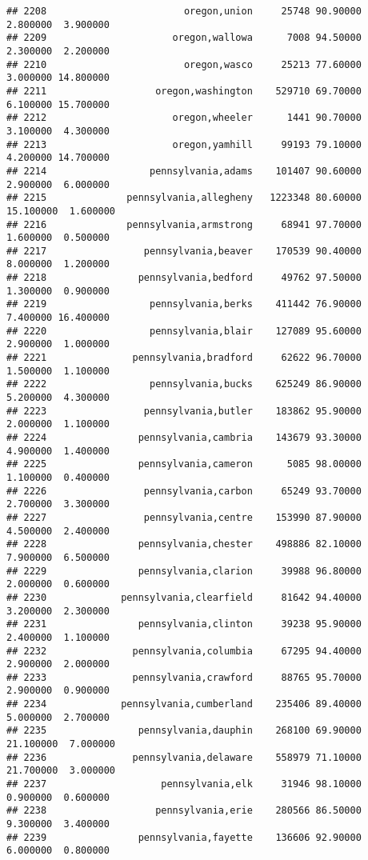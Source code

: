 \documentclass[
]{article}
\begin{document}
\begin{verbatim}
## 2208                        oregon,union     25748 90.90000  2.800000  3.900000
## 2209                      oregon,wallowa      7008 94.50000  2.300000  2.200000
## 2210                        oregon,wasco     25213 77.60000  3.000000 14.800000
## 2211                   oregon,washington    529710 69.70000  6.100000 15.700000
## 2212                      oregon,wheeler      1441 90.70000  3.100000  4.300000
## 2213                      oregon,yamhill     99193 79.10000  4.200000 14.700000
## 2214                  pennsylvania,adams    101407 90.60000  2.900000  6.000000
## 2215              pennsylvania,allegheny   1223348 80.60000 15.100000  1.600000
## 2216              pennsylvania,armstrong     68941 97.70000  1.600000  0.500000
## 2217                 pennsylvania,beaver    170539 90.40000  8.000000  1.200000
## 2218                pennsylvania,bedford     49762 97.50000  1.300000  0.900000
## 2219                  pennsylvania,berks    411442 76.90000  7.400000 16.400000
## 2220                  pennsylvania,blair    127089 95.60000  2.900000  1.000000
## 2221               pennsylvania,bradford     62622 96.70000  1.500000  1.100000
## 2222                  pennsylvania,bucks    625249 86.90000  5.200000  4.300000
## 2223                 pennsylvania,butler    183862 95.90000  2.000000  1.100000
## 2224                pennsylvania,cambria    143679 93.30000  4.900000  1.400000
## 2225                pennsylvania,cameron      5085 98.00000  1.100000  0.400000
## 2226                 pennsylvania,carbon     65249 93.70000  2.700000  3.300000
## 2227                 pennsylvania,centre    153990 87.90000  4.500000  2.400000
## 2228                pennsylvania,chester    498886 82.10000  7.900000  6.500000
## 2229                pennsylvania,clarion     39988 96.80000  2.000000  0.600000
## 2230             pennsylvania,clearfield     81642 94.40000  3.200000  2.300000
## 2231                pennsylvania,clinton     39238 95.90000  2.400000  1.100000
## 2232               pennsylvania,columbia     67295 94.40000  2.900000  2.000000
## 2233               pennsylvania,crawford     88765 95.70000  2.900000  0.900000
## 2234             pennsylvania,cumberland    235406 89.40000  5.000000  2.700000
## 2235                pennsylvania,dauphin    268100 69.90000 21.100000  7.000000
## 2236               pennsylvania,delaware    558979 71.10000 21.700000  3.000000
## 2237                    pennsylvania,elk     31946 98.10000  0.900000  0.600000
## 2238                   pennsylvania,erie    280566 86.50000  9.300000  3.400000
## 2239                pennsylvania,fayette    136606 92.90000  6.000000  0.800000

\end{verbatim}
\end{document}
